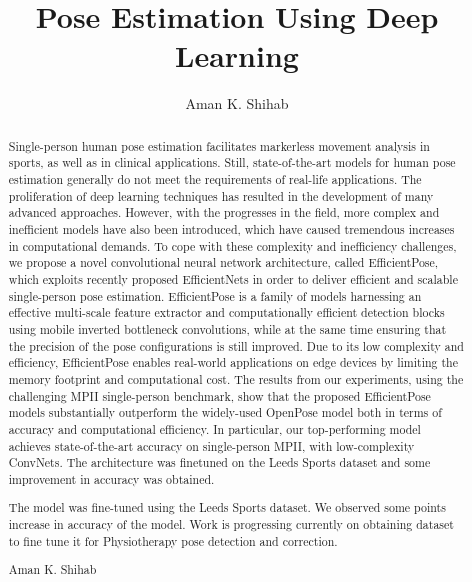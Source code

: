 \documentclass{fisatprojectfinal}
\title{Pose Estimation Using Deep Learning}
\author{Aman K. Shihab}
\begin{document}
\maketitle
\makecert

\newpage
{}
\setcounter{page}{1}
\thispagestyle{plain}
\renewcommand\abstractname{ABSTRACT}
\begin{abstract}
\vspace{5cm}
Single-person human pose estimation facilitates markerless movement analysis in sports, as well as in clinical applications.
Still, state-of-the-art models for human pose estimation generally do not meet the requirements of real-life applications.
The proliferation of deep learning techniques has resulted in the development of many advanced approaches. However,
with the progresses in the field, more complex and inefficient models have also been introduced, which have caused
tremendous increases in computational demands. To cope with these complexity and inefficiency challenges, we propose
a novel convolutional neural network architecture, called EfficientPose, which exploits recently proposed EfficientNets
in order to deliver efficient and scalable single-person pose estimation. EfficientPose is a family of models harnessing
an effective multi-scale feature extractor and computationally efficient detection blocks using mobile inverted bottleneck
convolutions, while at the same time ensuring that the precision of the pose configurations is still improved. Due to its low
complexity and efficiency, EfficientPose enables real-world applications on edge devices by limiting the memory footprint
and computational cost. The results from our experiments, using the challenging MPII single-person benchmark, show that
the proposed EfficientPose models substantially outperform the widely-used OpenPose model both in terms of accuracy and
computational efficiency. In particular, our top-performing model achieves state-of-the-art accuracy on single-person MPII,
with low-complexity ConvNets. The architecture was finetuned on the Leeds Sports dataset and some improvement in accuracy was obtained.
\end{abstract}



\newpage
\renewcommand\abstractname{Contribution by Author}
\thispagestyle{plain}
\begin{abstract}
\vspace{5cm}
The model was fine-tuned using the Leeds Sports dataset. We observed some points increase in accuracy of the model.
Work is progressing currently on obtaining dataset to fine tune it for Physiotherapy pose detection and correction.
\vspace{1cm}
\begin{flushright}
Aman K. Shihab
\end{flushright}
\end{abstract}
\end{document}
